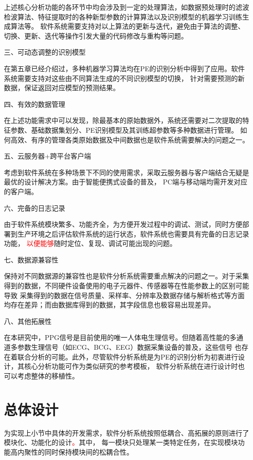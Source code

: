 上述核心分析功能的各环节中均会涉及到一定的处理算法，如数据预处理时的滤波检波算法、特征提取时的各种新型参数的计算算法以及识别模型的机器学习训练生成算法等。
软件系统需要支持对以上算法的更新与迭代，避免由于算法的调整、切换、更新、迭代等操作引发大量的代码修改与重构等问题。

三、可动态调整的识别模型

在第五章已经介绍过，多种机器学习算法均在PE的识别分析中得到了应用。软件系统需要支持对这些由不同算法生成的不同识别模型的切换，
针对需要预测的新数据，保证返回对应模型的预测结果。

四、有效的数据管理

在上述功能需求中可以发现，除最基本的原始数据外，系统还需要对二次提取的特征参数、基础数据集划分、PE识别模型及其训练超参数等多种数据进行管理。
如何高效、有序的管理各类原始数据及中间数据也是软件系统需要解决的问题之一。

五、云服务器+跨平台客户端

考虑到软件系统在多种场景下不同的使用需求，采取云服务器与客户端结合无疑是最优的设计解决方案。由于智能便携式设备的普及，
PC端与移动端均需开发对应的客户端。

六、完备的日志记录

由于软件系统模块繁多、功能齐全，为方便开发过程中的调试、测试，同时方便部署到生产环境之后评估软件系统的运行状态，软件系统也需要具有完备的日志记录功能，
\textcolor{red}{以便能够}随时定位、复现、调试可能出现的问题。

七、数据源兼容性

保持对不同数据源的兼容性也是软件分析系统需要重点解决的问题之一。对于采集得到的数据，不同硬件设备使用的电子元器件、传感器等在性能参数上的区别可能导致
采集得到的数据在信号质量、采样率、分辨率及数据存储与解析格式等方面均存在差异；而由数据库得到的数据，其字段信息也极容易出现差异。

八、其他拓展性

在本研究中，PPG信号是目前使用的唯一人体电生理信号。但随着高性能的多通道多参数生理信号（如ECG、BCG、EEG）数据采集设备的普及，这些信号
也存在着联合分析的可能\cite{Chen2021,Kachuee2015,LMX2019}。此外，尽管软件分析系统是为PE的识别分析为初衷进行设计，其核心分析功能可作为类似研究的参考模板，
软件分析系统在进行设计时也可以考虑整体的移植性。

\section{总体设计}

为实现上小节中具体的开发需求，软件分析系统按照低耦合、高拓展的原则进行了模块化、功能化的设计\textcolor{red}{。}其中，
每一模块只处理某一类特定任务，在实现模块功能高内聚性的同时保持模块间的松耦合性。

